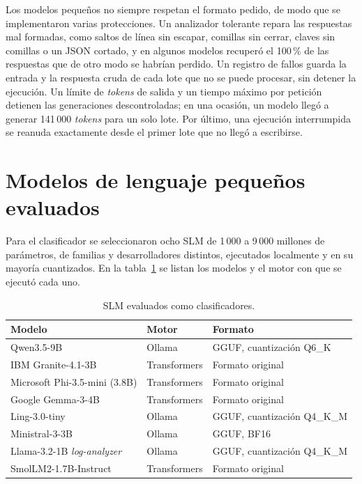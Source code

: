 Los modelos pequeños no siempre respetan el formato pedido, de modo que se implementaron varias protecciones. Un analizador tolerante repara las respuestas mal formadas, como saltos de línea sin escapar, comillas sin cerrar, claves sin comillas o un JSON cortado, y en algunos modelos recuperó el 100\,\% de las respuestas que de otro modo se habrían perdido. Un registro de fallos guarda la entrada y la respuesta cruda de cada lote que no se puede procesar, sin detener la ejecución. Un límite de \textit{tokens} de salida y un tiempo máximo por petición detienen las generaciones descontroladas; en una ocasión, un modelo llegó a generar 141\,000 \textit{tokens} para un solo lote. Por último, una ejecución interrumpida se reanuda exactamente desde el primer lote que no llegó a escribirse.

\section{Modelos de lenguaje pequeños evaluados}\label{sec:met_slm}

Para el clasificador se seleccionaron ocho SLM de 1\,000 a 9\,000 millones de parámetros, de familias y desarrolladores distintos, ejecutados localmente y en su mayoría cuantizados. En la tabla~\ref{tab:met_modelos} se listan los modelos y el motor con que se ejecutó cada uno.

\begin{table}[H]
\centering
\caption{SLM evaluados como clasificadores.}
\label{tab:met_modelos}
\small
\begin{tabular}{@{}p{5.6cm}p{2.6cm}p{5.6cm}@{}}
\toprule
\textbf{Modelo} & \textbf{Motor} & \textbf{Formato} \\
\midrule
Qwen3.5-9B & Ollama & GGUF, cuantización Q6\_K \\
IBM Granite-4.1-3B & Transformers & Formato original \\
Microsoft Phi-3.5-mini (3.8B) & Transformers & Formato original \\
Google Gemma-3-4B & Transformers & Formato original \\
Ling-3.0-tiny & Ollama & GGUF, cuantización Q4\_K\_M \\
Ministral-3-3B & Ollama & GGUF, BF16 \\
Llama-3.2-1B \textit{log-analyzer} & Ollama & GGUF, cuantización Q4\_K\_M \\
SmolLM2-1.7B-Instruct & Transformers & Formato original \\
\bottomrule
\end{tabular}
\normalsize
\end{table}

